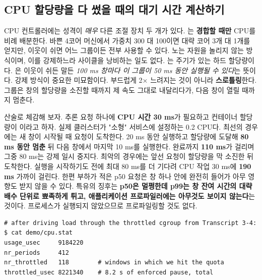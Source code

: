 \subsection*{CPU 할당량을 다 썼을 때의 대기 시간 계산하기}

CPU 컨트롤러에는 성격이 \textit{매우} 다른 조절 장치 두 개가 있다. 는 \textbf{경합할 때만} CPU를 비례 배분한다. 바쁜 4코어 머신에서 가중치 300 대 100이면 대략 코어 3개 대 1개를 얻지만, 이웃이 쉬면 어느 그룹이든 전부 사용할 수 있다. 노는 자원을 놀리지 않는 방식이며, 이를 강제하느라 사이클을 낭비하는 일도 없다. 는 주기가 있는 하드 할당량이다. 은 이웃이 쉬든 말든 \textit{100 ms 창마다 이 그룹이 50 ms 동안 실행될 수 있다}는 뜻이다. 강제 방식이 중요한 미묘함이다. 부드럽게 2× 느려지는 것이 아니라 \textbf{스로틀링}한다. 그룹은 창의 할당량을 소진할 때까지 제 속도 그대로 내달리다가, 다음 창이 열릴 때까지 멈춘다.

산술로 체감해 보자. 추론 요청 하나에 \textbf{CPU 시간 30 ms}가 필요하고 컨테이너 할당량이 이라고 하자. 실제 클러스터가 "소형" 서비스에 설정하는 0.2 CPU다. 최선의 경우에는 새 창이 시작될 때 요청이 도착한다. 20 ms 동안 실행하고 할당량에 도달해 \textbf{80 ms 동안 멈춘} 뒤 다음 창에서 마지막 10 ms를 실행한다. 완료까지 \textbf{110 ms}가 걸리며 그중 80 ms는 강제 일시 중지다. 최악의 경우에는 앞선 요청이 할당량을 막 소진한 뒤 도착한다. 실행을 시작하기도 전에 최대 80 ms를 더 기다려 CPU 작업 30 ms에 \textbf{190 ms} 가까이 걸린다. 한편 부하가 적은 p50 요청은 창 하나 안에 완전히 들어가 아무 영향도 받지 않을 수 있다. 특유의 징후는 \textbf{p50은 멀쩡한데 p99는 창 잔여 시간의 대략 배수 단위로 뾰족하게 튀고, 애플리케이션 프로파일러에는 아무것도 보이지 않는다}는 것이다. 프로세스가 실행되지 않았으므로 프로파일링할 것도 없다.

\begin{terminalbox}
\begin{Verbatim}[breaklines=true,breakanywhere=true,fontsize=\small,formatcom=\color{tbbtermfg},codes=\tbbcodeactive]
# after driving load through the throttled cgroup from Transcript 3-4:
$ cat demo/cpu.stat
usage_usec     9184220
nr_periods     412
nr_throttled   118        # windows in which we hit the quota
throttled_usec 8221340    # 8.2 s of enforced pause, total
\end{Verbatim}
\end{terminalbox}

